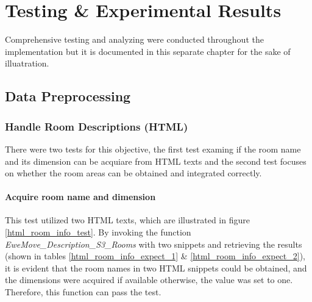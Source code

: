 \documentclass[12pt,twoside]{report}
\begin{document}
\chapter{Testing \& Experimental Results}
Comprehensive testing and analyzing were conducted throughout the implementation but it is documented in this separate chapter for the sake of illuatration. 

\section{Data Preprocessing}

\subsection{Handle Room Descriptions (HTML)}
There were two tests for this objective, the first test examing if the room name and its dimension can be acquiare from HTML texts and the second test focuses on whether the room areas can be obtained and integrated correctly. 

\subsubsection{Acquire room name and dimension}
This test utilized two HTML texts, which are illustrated in figure \ref{html_room_info_test}. By invoking the function \textit{EweMove\_Description\_S3\_Rooms} with two snippets and retrieving the results (shown in tables \ref{html_room_info_expect_1} \& \ref{html_room_info_expect_2}), it is evident that the room names in two HTML snippets could be obtained, and the dimensions were acquired if available otherwise, the value was set to one. Therefore, this function can pass the test.
\end{document}
